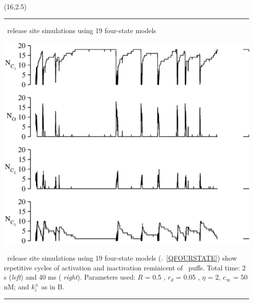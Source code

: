 \documentclass[a0]{a0poster}
\def\CHead#1{\begin{center} {\LARGE\color{DarkBlue} #1} \end{center} \bigskip}
\begin{document}
\begin{textblock}{7}(16,2.5)
\hrule\medskip
\CHead{ \Ca\ release site simulations using 19 four-state models } 

\begin{center}
\includegraphics{FigSSRS27.eps}
\end{center}

\Ca\ release site simulations using 19 four-state models
(\Eq.~\ref{QFOURSTATE}) show repetitive cycles of activation and inactivation
reminicent of \Ca\ puffs.  Total time:  2 s ({\it left}) and 40 ms ({\it
right}).  Parameters used: $R$ = 0.5 \Um, $r_d$ = 0.05 \Um, $\eta$ = 2,
$c_\infty$ = 50 nM; and $k_i^\pm$ as in B.

\bigskip
\hrule
\end{textblock}
\end{document}
